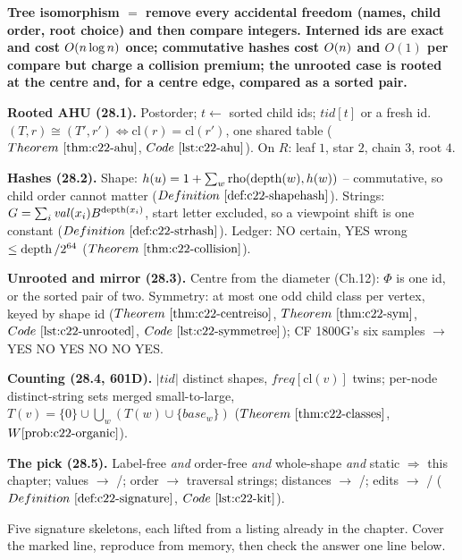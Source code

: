 
\begin{quickref}
\textbf{Tree isomorphism \(=\) remove every accidental freedom (names, child order, root
choice) and then compare integers.  Interned ids are exact and cost \(O(n\log n)\) once;
commutative hashes cost \(O(n)\) and \(O(1)\) per compare but charge a collision
premium; the unrooted case is rooted at the centre and, for a centre edge, compared as a
sorted pair.}

\medskip
\textbf{Rooted AHU (28.1).} Postorder; \(t\gets\) sorted child ids; \(\mathit{tid}[t]\) or a
fresh id.  \((T,r)\cong(T',r')\iff\mathrm{cl}(r)=\mathrm{cl}(r')\), one shared table
(\(\thmref{c22-ahu}\), \(\coderef{c22-ahu}\)).  On \(R\): leaf \(1\), star \(2\), chain
\(3\), root \(4\).

\medskip
\textbf{Hashes (28.2).} Shape: \(h(u)=1+\sum_w\mathrm{rho}(\operatorname{depth}(w),h(w))\) -- commutative,
so child order cannot matter (\(\defref{c22-shapehash}\)).  Strings:
\(G=\sum_i\mathit{val}(x_i)B^{\operatorname{depth}(x_i)}\), start letter excluded, so a viewpoint shift is
one constant (\(\defref{c22-strhash}\)).  Ledger: NO certain, YES wrong
\(\le\operatorname{depth}/2^{64}\) (\(\thmref{c22-collision}\)).

\medskip
\textbf{Unrooted and mirror (28.3).} Centre from the diameter (Ch.12):
\(\Phi\) is one id, or the sorted pair of two.  Symmetry: at most one odd child class per
vertex, keyed by shape id (\(\thmref{c22-centreiso}\), \(\thmref{c22-sym}\),
\(\coderef{c22-unrooted}\), \(\coderef{c22-symmetree}\)); CF 1800G's six samples
\(\to\) YES NO YES NO NO YES.

\medskip
\textbf{Counting (28.4, 601D).} \(|\mathit{tid}|\) distinct shapes,
\(\mathit{freq}[\mathrm{cl}(v)]\) twins; per-node distinct-string sets merged
small-to-large, \(T(v)=\{0\}\cup\bigcup_w(T(w)\cup\{\mathit{base}_w\})\)
(\(\thmref{c22-classes}\), \(\probref{c22-organic}\)).

\medskip
\textbf{The pick (28.5).} Label-free \emph{and} order-free \emph{and} whole-shape \emph{and}
static \(\Rightarrow\) this chapter; values \(\to\) /; order \(\to\)
traversal strings; distances \(\to\) /; edits \(\to\)
/ (\(\defref{c22-signature}\), \(\coderef{c22-kit}\)).
\end{quickref}


Five signature skeletons, each lifted from a listing already in the chapter.  Cover the
marked line, reproduce from memory, then check the answer one line below.

